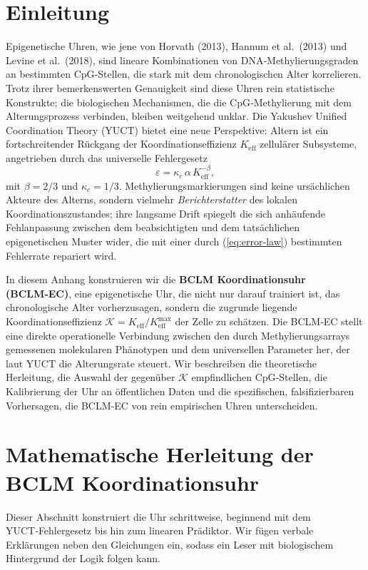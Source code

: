 \documentclass[12pt,a4paper]{article}
\newcommand{\REL}{\mathcal{K}}          %
\begin{document}
	\tableofcontents
	\newpage
	
	\section{Einleitung}
	\label{sec:intro}
	Epigenetische Uhren, wie jene von Horvath (2013), Hannum et al.\ (2013) und Levine et al.\ (2018), sind lineare Kombinationen von DNA‑Methylierungsgraden an bestimmten CpG‑Stellen, die stark mit dem chronologischen Alter korrelieren.
	Trotz ihrer bemerkenswerten Genauigkeit sind diese Uhren rein statistische Konstrukte; die biologischen Mechanismen, die die CpG‑Methylierung mit dem Alterungsprozess verbinden, bleiben weitgehend unklar.
	Die Yakushev Unified Coordination Theory (YUCT) bietet eine neue Perspektive: Altern ist ein fortschreitender Rückgang der Koordinationseffizienz \(K_{\mathrm{eff}}\) zellulärer Subsysteme, angetrieben durch das universelle Fehlergesetz
	\begin{equation}
		\varepsilon = \kappa_c \, \alpha \, K_{\mathrm{eff}}^{-\beta},
		\label{eq:error-law}
	\end{equation}
	mit \(\beta = 2/3\) und \(\kappa_c = 1/3\).
	Methylierungsmarkierungen sind keine ursächlichen Akteure des Alterns, sondern vielmehr \emph{Berichterstatter} des lokalen Koordinationszustandes; ihre langsame Drift spiegelt die sich anhäufende Fehlanpassung zwischen dem beabsichtigten und dem tatsächlichen epigenetischen Muster wider, die mit einer durch (\ref{eq:error-law}) bestimmten Fehlerrate repariert wird.
	
	In diesem Anhang konstruieren wir die \textbf{BCLM Koordinationsuhr (BCLM‑EC)}, eine epigenetische Uhr, die nicht nur darauf trainiert ist, das chronologische Alter vorherzusagen, sondern die zugrunde liegende Koordinationseffizienz \(\REL = K_{\mathrm{eff}}/K_{\mathrm{eff}}^{\max}\) der Zelle zu schätzen.
	Die BCLM‑EC stellt eine direkte operationelle Verbindung zwischen den durch Methylierungsarrays gemessenen molekularen Phänotypen und dem universellen Parameter her, der laut YUCT die Alterungsrate steuert.
	Wir beschreiben die theoretische Herleitung, die Auswahl der gegenüber \(\REL\) empfindlichen CpG‑Stellen, die Kalibrierung der Uhr an öffentlichen Daten und die spezifischen, falsifizierbaren Vorhersagen, die BCLM‑EC von rein empirischen Uhren unterscheiden.
	
	\section{Mathematische Herleitung der BCLM Koordinationsuhr}
	\label{sec:math}
	Dieser Abschnitt konstruiert die Uhr schrittweise, beginnend mit dem YUCT‑Fehlergesetz bis hin zum linearen Prädiktor. Wir fügen verbale Erklärungen neben den Gleichungen ein, sodass ein Leser mit biologischem Hintergrund der Logik folgen kann.
	
\end{document}
